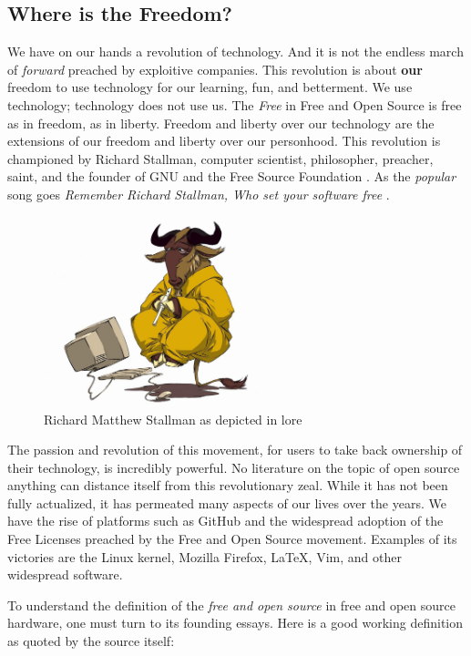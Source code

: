 \documentclass[acmtog]{acmart}
\begin{document}
\subsection{Where is the Freedom?}
We have on our hands a revolution of technology. 
And it is not the endless march of \textit{forward} preached by exploitive companies.
This revolution is about \textbf{our} freedom to use technology for our learning, fun, and betterment.
We use technology; technology does not use us. 
The \textit{Free} in Free and Open Source is free as in freedom, as in liberty.
Freedom and liberty over our technology are the extensions of our freedom and liberty over our personhood.
This revolution is championed by Richard Stallman, computer scientist, philosopher, preacher, saint, and the founder of GNU and the Free Source Foundation \cite{b0_stallman}.
As the \textit{popular} song goes \textit{Remember Richard Stallman,
Who set your software free} \cite{song_GNUs_Not_Unix}.

\begin{figure}[h]
    \centering
    \includegraphics[width=240px]{Images/the_wise_gnu.jpg}
    \caption{Richard Matthew Stallman as depicted in lore}
    \label{fig:rms}
\end{figure}

The passion and revolution of this movement, for users to take back ownership of their technology, is incredibly powerful. 
No literature on the topic of open source anything can distance itself from this revolutionary zeal. 
While it has not been fully actualized, it has permeated many aspects of our lives over the years.
We have the rise of platforms such as GitHub and the widespread adoption of the Free Licenses preached by the Free and Open Source movement. 
Examples of its victories are the Linux kernel, Mozilla Firefox, \LaTeX, Vim, and other widespread software. 

To understand the definition of the \textit{free and open source} in free and open source hardware, one must turn to its founding essays. Here is a good working definition as quoted by the source itself:
\end{document}

